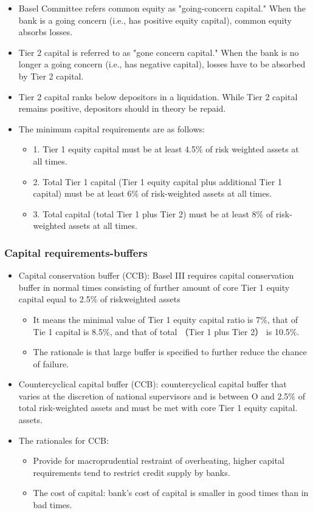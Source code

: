 \begin{itemize}
\item Basel Committee refers common equity as "going-concern capital." When the bank is a going concern (i.e., has positive equity capital), common equity absorbs losses.
\item Tier 2 capital is referred to as "gone concern capital." When the bank is no longer a going concern (i.e., has negative capital), losses have to be absorbed by Tier 2 capital.
\item Tier 2 capital ranks below depositors in a liquidation. While Tier 2 capital remains positive, depositors should in theory be repaid.
\item The minimum capital requirements are as follows:
    \begin{itemize}
    \item 1. Tier 1 equity capital must be at least 4.5\% of risk weighted assets at all times.
    \item 2. Total Tier 1 capital (Tier 1 equity capital plus additional Tier 1 capital) must be at least 6\% of risk-weighted assets at all times.
    \item 3. Total capital (total Tier 1 plus Tier 2) must be at least 8\% of risk-weighted assets at all times.
    \end{itemize}
\end{itemize}



\subsubsection{Capital requirements-buffers}
\begin{itemize}
\item Capital conservation buffer (CCB): Basel III requires capital conservation buffer in normal times consisting of further amount of core Tier 1 equity capital equal to 2.5\% of riskweighted assets
    \begin{itemize}
    \item It means the minimal value of Tier 1 equity capital ratio is 7\%, that of Tie 1 capital is 8.5\%, and that of total （Tier 1 plus Tier 2） is 10.5\%.
    \item The rationale is that large buffer is specified to further reduce the chance of failure.
    \end{itemize}

\item Countercyclical capital buffer (CCB): countercyclical capital buffer that varies at the discretion of national supervisors and is between O and 2.5\% of total risk-weighted assets and must be met with core Tier 1 equity capital. assets.
\item The rationales for CCB:
    \begin{itemize}
    \item Provide for macroprudential restraint of overheating, higher capital requirements tend to restrict credit supply by banks.
    \item The cost of capital: bank's cost of capital is smaller in good times than in bad times.
    \end{itemize}
\end{itemize}



